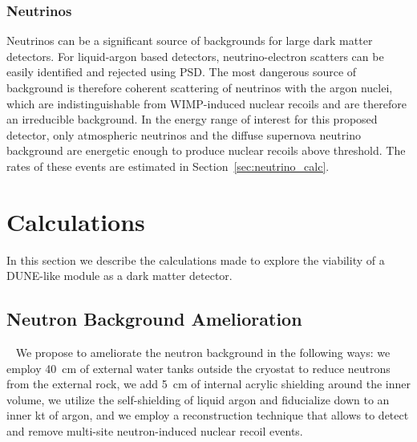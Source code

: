 \documentclass[a4paper,11pt]{article}
\newcommand{\rs}[1]{{\tt \color{purple}#1}}
\begin{document}

\subsubsection{Neutrinos}
Neutrinos can be a significant source of backgrounds for large dark matter detectors. For liquid-argon based detectors, neutrino-electron scatters can be easily identified and rejected using PSD. The most dangerous source of background is therefore coherent scattering of neutrinos with the argon nuclei, which are indistinguishable from WIMP-induced nuclear recoils and are therefore an irreducible background. In the energy range of interest for this proposed detector, only atmospheric neutrinos and the diffuse supernova neutrino background are energetic enough to produce nuclear recoils above threshold. The rates of these events are estimated in Section~\ref{sec:neutrino_calc}.

\section{Calculations}

In this section we describe the calculations made to explore the viability of a DUNE-like module as a dark matter detector.

\subsection{Neutron Background Amelioration}~\label{sec:nba}
We propose to ameliorate the neutron background in the following ways: we employ 40~cm of external water tanks outside the cryostat to reduce neutrons from the external rock, we add 5~cm of internal acrylic shielding around the inner volume, we utilize the self-shielding of liquid argon and fiducialize down to an inner kt of argon, and we employ a reconstruction technique that allows to detect and remove multi-site neutron-induced nuclear recoil events. 

\end{document}
